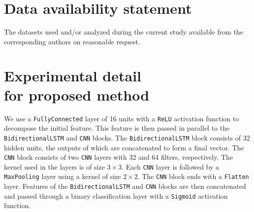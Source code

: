 \documentclass[aps,prb,groupedaddress,twocolumn,showpacs,dvipdfmx,superscriptaddress,pdftex]{revtex4-2}
\begin{document}
\section{Data availability statement}
The datasets used and/or analyzed during the current study available from the corresponding authors on reasonable request.

\clearpage
%  
 

\clearpage

\appendix
\section{Experimental detail\\for proposed method}
\label{app:our_experiment}


We use a \verb|FullyConnected| layer of 16 units with a \verb|ReLU| activation function to decompose the initial feature. This feature is then passed in parallel to the \verb|BidirectionalLSTM| and \verb|CNN| blocks. The \verb|BidirectionalLSTM| block consists of 32 hidden units, the outputs of which are concatenated to form a final vector. The \verb|CNN| block consists of two \verb|CNN| layers with 32 and 64 filters, respectively. The kernel used in the layers is of size $3\times 3$. Each \verb|CNN| layer is followed by a \verb|MaxPooling| layer using a kernel of size $2\times 2$. The \verb|CNN| block ends with a \verb|Flatten| layer. Features of the \verb|BidirectionalLSTM| and \verb|CNN| blocks are then concatenated and passed through a binary classification layer with a \verb|Sigmoid| activation function.
\end{document}
